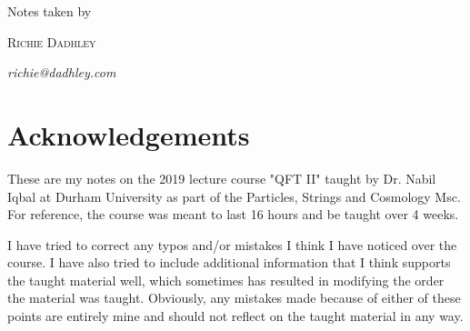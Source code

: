 \documentclass[11pt,oneside]{book}
\theoremstyle{definition} %
\theoremstyle{plain} %
\theoremstyle{remark} %
\theoremstyle{underline}
\begin{document}
\begin{titlepage}
	    Notes taken by 
	
	    \vspace{0.5\baselineskip} %
	
	    {\scshape\Large Richie Dadhley} %
	   
	    \vspace{0.5\baselineskip} %
	    \textit{richie@dadhley.com} %
	
	    \vfill %
\end{titlepage}




\newpage
\section*{Acknowledgements}

These are my notes on the 2019 lecture course "QFT II" taught by Dr. Nabil Iqbal at Durham University as part of the Particles, Strings and Cosmology Msc. For reference, the course was meant to last 16 hours and be taught over 4 weeks. \\


I have tried to correct any typos and/or mistakes I think I have noticed over the course. I have also tried to include additional information that I think supports the taught material well, which sometimes has resulted in modifying the order the material was taught. Obviously, any mistakes made because of either of these points are entirely mine and should not reflect on the taught material in any way. \\


\end{document}
